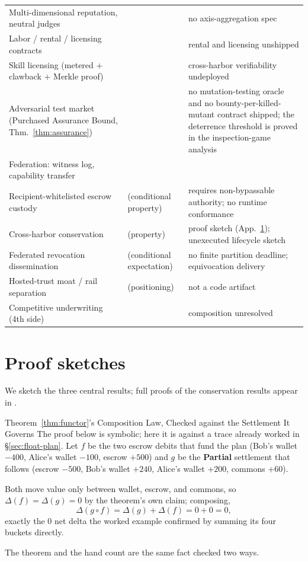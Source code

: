 \documentclass[11pt,a4paper]{article}
\theoremstyle{definition}
\theoremstyle{definition}
\theoremstyle{remark}
\begin{document}
{\begin{xltabular}{\textwidth}{@{}>{\raggedright\arraybackslash}X l >{\raggedright\arraybackslash}p{0.31\textwidth}@{}}
Multi-dimensional reputation, neutral judges & \Vision{} & no axis-aggregation spec \\
Labor / rental / licensing contracts & \Designed{} & rental and licensing unshipped \\
Skill licensing (metered $+$ clawback $+$ Merkle proof) & \Designed{} &
  cross-harbor verifiability undeployed \\
Adversarial test market (Purchased Assurance Bound, Thm.~\ref{thm:assurance}) &
  \Vision{} & no mutation-testing oracle and no bounty-per-killed-mutant contract
  shipped; the deterrence threshold is proved in the inspection-game
  analysis~ \\
Federation: witness log, capability transfer & \Designed{} &  \\
Recipient-whitelisted escrow custody & \Designed{} (conditional property) &
  requires non-bypassable authority; no runtime conformance \\
Cross-harbor conservation & \Designed{} (property) & proof sketch
  (App.~\ref{app:proofs}); unexecuted lifecycle sketch \\
Federated revocation dissemination & \Designed{} (conditional expectation) & no finite partition deadline; equivocation delivery \Open{} \\
Hosted-trust moat / rail separation & \Designed{} (positioning) & not a code artifact \\
Competitive underwriting (4th side) & \Vision{} & composition unresolved \\
\end{xltabular}}

\section{Proof sketches}\label{app:proofs}

We sketch the three central results; full proofs of the conservation results
appear in .

\begin{pdexample}{Theorem~\ref{thm:functor}'s Composition Law, Checked against the Settlement It Governs}
\setlength{\parskip}{4pt plus 1pt}
The proof below is symbolic; here it is against a trace already worked in
\S\ref{sec:float-plan}. Let $f$ be the two escrow debits that fund the plan
(Bob's wallet $-400$, Alice's wallet $-100$, escrow $+500$) and $g$ be the
\textbf{Partial} settlement that follows (escrow $-500$, Bob's wallet $+240$,
Alice's wallet $+200$, commons $+60$).

Both move value only between wallet,
escrow, and commons, so $\Delta(f)=\Delta(g)=0$ by the theorem's own claim;
composing, \[
\Delta(g\circ f)=\Delta(g)+\Delta(f)=0+0=0,
\] exactly the $0$ net
delta the worked example confirmed by summing its four buckets directly.

The
theorem and the hand count are the same fact checked two ways.
\end{pdexample}
\end{document}
